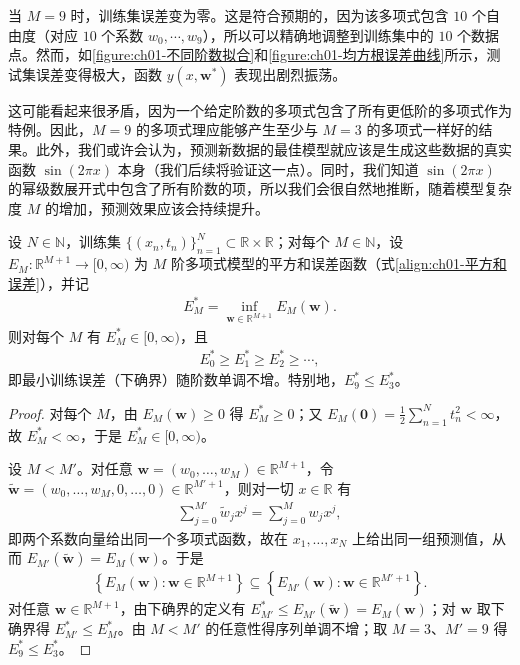 \documentclass[../../main.tex]{subfiles}
\begin{document}
当 $M=9$ 时，训练集误差变为零。这是符合预期的，因为该多项式包含 $10$ 个自由度（对应 $10$ 个系数 $w_0,\cdots,w_9$），所以可以精确地调整到训练集中的 $10$ 个数据点。然而，如\cref{figure:ch01-不同阶数拟合}和\cref{figure:ch01-均方根误差曲线}所示，测试集误差变得极大，函数 $y(x,\mathbf{w}^{*})$ 表现出剧烈振荡。

这可能看起来很矛盾，因为一个给定阶数的多项式包含了所有更低阶的多项式作为特例。因此，$M=9$ 的多项式理应能够产生至少与 $M=3$ 的多项式一样好的结果。此外，我们或许会认为，预测新数据的最佳模型就应该是生成这些数据的真实函数 $\sin(2\pi x)$ 本身（我们后续将验证这一点）。同时，我们知道 $\sin(2\pi x)$ 的幂级数展开式中包含了所有阶数的项，所以我们会很自然地推断，随着模型复杂度 $M$ 的增加，预测效果应该会持续提升。

\begin{proposition}[训练误差随阶数单调不增]\label{proposition:ch01-训练误差单调性}
设 $N\in\mathbb{N}$，训练集 $\{(x_n,t_n)\}_{n=1}^{N}\subset\mathbb{R}\times\mathbb{R}$；对每个 $M\in\mathbb{N}$，设 $E_{M}:\mathbb{R}^{M+1}\to[0,\infty)$ 为 $M$ 阶多项式模型的平方和误差函数（式\eqref{align:ch01-平方和误差}），并记
\begin{align*}
  E_{M}^{*}=\inf_{\mathbf{w}\in\mathbb{R}^{M+1}}E_{M}(\mathbf{w}).
\end{align*}
则对每个 $M$ 有 $E_{M}^{*}\in[0,\infty)$，且
\begin{align*}
  E_{0}^{*} \geqslant E_{1}^{*} \geqslant E_{2}^{*} \geqslant \cdots,
\end{align*}
即最小训练误差（下确界）随阶数单调不增。特别地，$E_{9}^{*}\leqslant E_{3}^{*}$。
\end{proposition}

\begin{proof}
对每个 $M$，由 $E_{M}(\mathbf{w})\geqslant0$ 得 $E_{M}^{*}\geqslant0$；又 $E_{M}(\mathbf{0})=\frac{1}{2}\sum_{n=1}^{N}t_n^{2}<\infty$，故 $E_{M}^{*}<\infty$，于是 $E_{M}^{*}\in[0,\infty)$。

设 $M<M'$。对任意 $\mathbf{w}=(w_0,\dots,w_M)\in\mathbb{R}^{M+1}$，令 $\tilde{\mathbf{w}}=(w_0,\dots,w_M,0,\dots,0)\in\mathbb{R}^{M'+1}$，则对一切 $x\in\mathbb{R}$ 有
\begin{align*}
 \sum_{j=0}^{M'} \tilde{w}_j x^{j} = \sum_{j=0}^{M} w_j x^{j},
\end{align*}
即两个系数向量给出同一个多项式函数，故在 $x_1,\dots,x_N$ 上给出同一组预测值，从而 $E_{M'}(\tilde{\mathbf{w}})=E_{M}(\mathbf{w})$。于是
\begin{align*}
 \left\{E_{M}(\mathbf{w}) : \mathbf{w}\in\mathbb{R}^{M+1}\right\} \subseteq \left\{E_{M'}(\mathbf{w}) : \mathbf{w}\in\mathbb{R}^{M'+1}\right\}.
\end{align*}
对任意 $\mathbf{w}\in\mathbb{R}^{M+1}$，由下确界的定义有 $E_{M'}^{*}\leqslant E_{M'}(\tilde{\mathbf{w}})=E_{M}(\mathbf{w})$；对 $\mathbf{w}$ 取下确界得 $E_{M'}^{*}\leqslant E_{M}^{*}$。由 $M<M'$ 的任意性得序列单调不增；取 $M=3$、$M'=9$ 得 $E_{9}^{*}\leqslant E_{3}^{*}$。
\end{proof}
\end{document}
